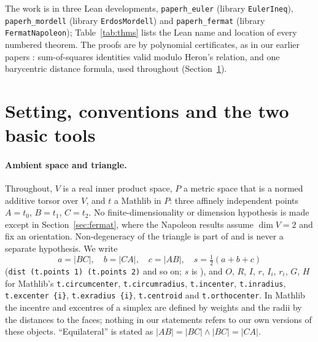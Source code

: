 \documentclass[11pt]{article}
\theoremstyle{definition}
\theoremstyle{remark}
\newcommand{\lean}[1]{\texttt{#1}}
\begin{document}
The work is in three Lean developments, \lean{paperh\_euler} (library \lean{EulerIneq}),
\lean{paperh\_mordell} (library \lean{ErdosMordell}) and \lean{paperh\_fermat} (library
\lean{FermatNapoleon}); Table~\ref{tab:thms} lists the Lean name and location of every numbered
theorem. The proofs are by polynomial certificates, as in our earlier papers
\cite{paperA,paperG}: sum-of-squares identities valid modulo Heron's relation, and one barycentric
distance formula, used throughout (Section~\ref{sec:setting}).
\section{Setting, conventions and the two basic tools}\label{sec:setting}
\paragraph{Ambient space and triangle.} Throughout, $V$ is a real inner product space, $P$ a metric
space that is a normed additive torsor over $V$, and $t$ a Mathlib  in $P$:
three affinely independent points $A=t_0$, $B=t_1$, $C=t_2$. No finite-dimensionality or dimension
hypothesis is made except in Section~\ref{sec:fermat}, where the Napoleon results assume
$\dim V=2$ and fix an orientation. Non-degeneracy of the triangle is part of
 and is never a separate hypothesis. We write
\[
a=|BC|,\quad b=|CA|,\quad c=|AB|,\quad s=\tfrac12(a+b+c)
\]
(\lean{dist (t.points 1) (t.points 2)} and so on; $s$ is ), and
$O$, $R$, $I$, $r$, $I_i$, $r_i$, $G$, $H$ for Mathlib's \lean{t.circumcenter},
\lean{t.circumradius}, \lean{t.incenter}, \lean{t.inradius}, \lean{t.excenter \{i\}},
\lean{t.exradius \{i\}}, \lean{t.centroid} and \lean{t.orthocenter}. In Mathlib the incentre and
excentres of a simplex are defined by weights and the radii by the distances to the faces; nothing
in our statements refers to our own versions of these objects. ``Equilateral'' is stated as
$|AB|=|BC|\wedge|BC|=|CA|$.
\end{document}
